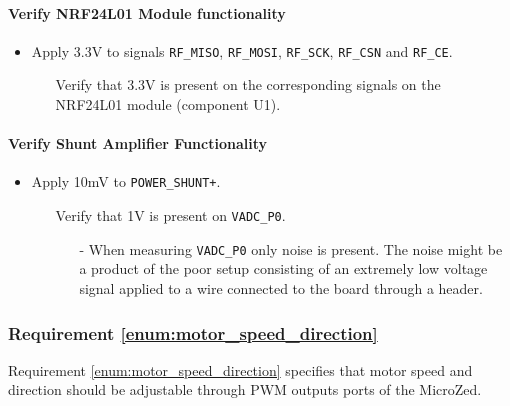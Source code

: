 \paragraph{Verify NRF24L01 Module functionality} %
\label{par:verify_nrf24l01_module_functionality}
\begin{itemize}
	\item Apply 3.3V to signals \texttt{RF\_MISO}, \texttt{RF\_MOSI}, \texttt{RF\_SCK}, \texttt{RF\_CSN} and \texttt{RF\_CE}.
	\begin{itemize}
		\item[\cmark] Verify that 3.3V is present on the corresponding signals on the NRF24L01 module (component U1).
	\end{itemize}
\end{itemize}

\paragraph{Verify Shunt Amplifier Functionality} %
\label{par:verify_shunt_amplifier_functionality}
\begin{itemize}
	\item Apply 10mV to \texttt{POWER\_SHUNT+}.
	\begin{itemize}
		\item[\xmark] Verify that 1V is present on \texttt{VADC\_P0}.
		\begin{itemize}
			\item[-] When measuring \texttt{VADC\_P0} only noise is present. 
			The noise might be a product of the poor setup consisting of an extremely low voltage signal applied to a wire connected to the board through a header. 
		\end{itemize}
	\end{itemize}
\end{itemize}


\subsubsection{Requirement \ref{enum:motor_speed_direction}} %
\label{subs:requirement_enum:motor_speed_direction}
Requirement \ref{enum:motor_speed_direction} specifies that motor speed and direction should be adjustable through PWM outputs
ports of the MicroZed.

